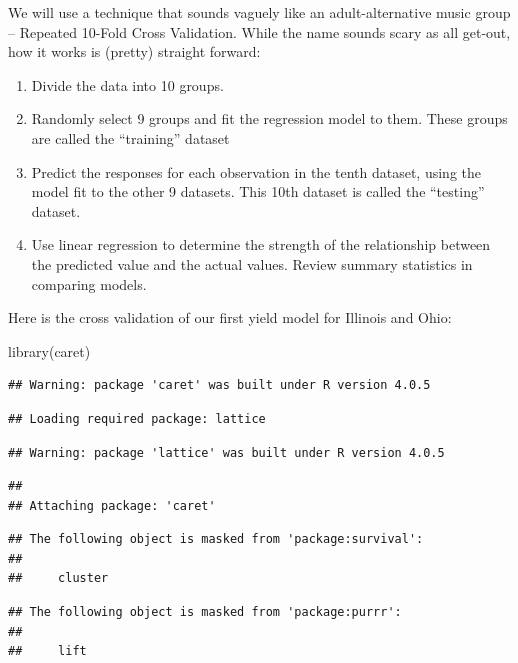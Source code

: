 \documentclass[
]{book}
\newenvironment{Shaded}{\begin{snugshade}}{\end{snugshade}}
\newcommand{\FunctionTok}[1]{\textcolor[rgb]{0.00,0.00,0.00}{#1}}
\newcommand{\NormalTok}[1]{#1}
\providecommand{\tightlist}{%
  \setlength{\itemsep}{0pt}\setlength{\parskip}{0pt}}
\begin{document}
We will use a technique that sounds vaguely like an adult-alternative music group -- Repeated 10-Fold Cross Validation. While the name sounds scary as all get-out, how it works is (pretty) straight forward:

\begin{enumerate}
\def\labelenumi{\arabic{enumi}.}
\tightlist
\item
  Divide the data into 10 groups.
\item
  Randomly select 9 groups and fit the regression model to them. These groups are called the ``training'' dataset
\item
  Predict the responses for each observation in the tenth dataset, using the model fit to the other 9 datasets. This 10th dataset is called the ``testing'' dataset.
\item
  Use linear regression to determine the strength of the relationship between the predicted value and the actual values. Review summary statistics in comparing models.
\end{enumerate}

Here is the cross validation of our first yield model for Illinois and Ohio:

\begin{Shaded}
\begin{Highlighting}[]
\FunctionTok{library}\NormalTok{(caret)}
\end{Highlighting}
\end{Shaded}

\begin{verbatim}
## Warning: package 'caret' was built under R version 4.0.5
\end{verbatim}

\begin{verbatim}
## Loading required package: lattice
\end{verbatim}

\begin{verbatim}
## Warning: package 'lattice' was built under R version 4.0.5
\end{verbatim}

\begin{verbatim}
## 
## Attaching package: 'caret'
\end{verbatim}

\begin{verbatim}
## The following object is masked from 'package:survival':
## 
##     cluster
\end{verbatim}

\begin{verbatim}
## The following object is masked from 'package:purrr':
## 
##     lift
\end{verbatim}
\end{document}
